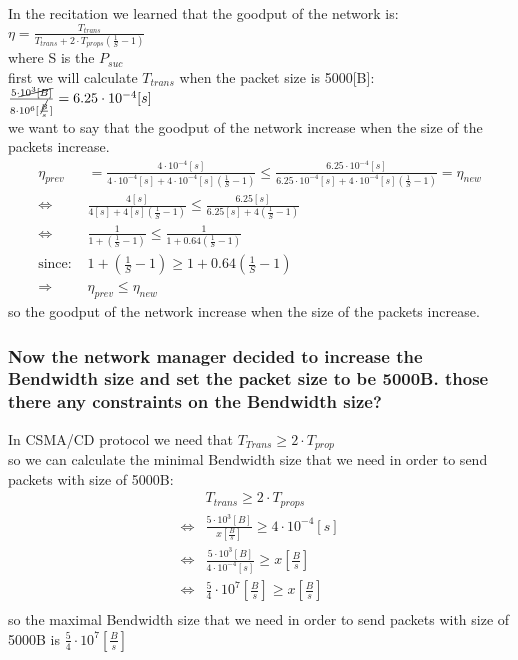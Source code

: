 \documentclass{article}
\begin{document}
In the recitation we learned that the goodput of the network is: $\eta = \frac{T_{trans}}{T_{trans}+2 \cdot T_{props}(\frac{1}{S}-1)}$\\ where S is the $P_{suc}$\\
first we will calculate $T_{trans}$ when the packet size is 5000[B]: $\frac{5\cdot \cancel{10^3[B]}}{8\cdot 10^{6} [\frac{\cancel{B}}{s}]}= 6.25 \cdot 10^{-4}[s]$\\
we want to say that the goodput of the network increase when the size of the packets increase.\\
\begin{equation}
    \begin{aligned}
        \eta_{prev} &= \frac{4\cdot 10^{-4}[s]}{4\cdot 10^{-4}[s]+4 \cdot 10^{-4}[s](\frac{1}{S}-1)} \leq \frac{6.25 \cdot 10^{-4}[s]}{6.25\cdot 10^{-4}[s]+4\cdot 10^{-4}[s](\frac{1}{S}-1)} = \eta_{new}\\ 
        \iff &  \frac{4[s]}{4[s]+4 [s](\frac{1}{S}-1)} \leq \frac{6.25 [s]}{6.25[s]+4(\frac{1}{S}-1)}\\ 
        \iff &  \frac{1}{1+(\frac{1}{S}-1)} \leq \frac{1}{1+0.64(\frac{1}{S}-1)}\\
        \text{since: } & 1+(\frac{1}{S}-1) \geq 1+0.64(\frac{1}{S}-1)\\
        \Rightarrow & \eta_{prev} \leq \eta_{new}
    \end{aligned}
\end{equation}
so the goodput of the network increase when the size of the packets increase. 

\subsubsection{Now the network manager decided to increase the Bendwidth size and set the packet size to be 5000B. those there any constraints on the Bendwidth size?}
In CSMA/CD protocol we need that $T_{Trans} \geq 2 \cdot T_{prop}$\\
so we can calculate the minimal Bendwidth size that we need in order to send packets with size of 5000B:
\begin{equation}
    \begin{aligned}
       & T_{trans} \geq 2 \cdot T_{props}\\
        \iff &\frac{5 \cdot 10^{3}[B]}{x[\frac{B}{s}]} \geq 4 \cdot 10^{-4}[s]\\
        \iff & \frac{5 \cdot 10^{3}[B]}{4\cdot 10^{-4}[s]} \geq x[\frac{B}{s}]\\
        \iff & \frac{5}{4} \cdot 10^{7}[\frac{B}{s}] \geq x[\frac{B}{s}]\\
    \end{aligned}
\end{equation}
so the maximal Bendwidth size that we need in order to send packets with size of 5000B is $\frac{5}{4} \cdot 10^{7}[\frac{B}{s}]$
\end{document}
